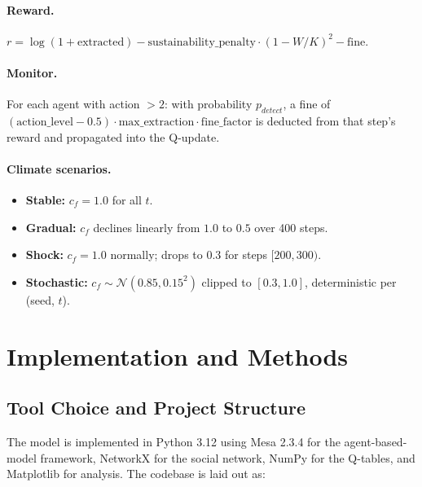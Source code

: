 \documentclass[12pt, a4paper]{article}
\begin{document}
\paragraph{Reward.}
$r = \log(1 + \text{extracted}) - \text{sustainability\_penalty} \cdot (1 - W/K)^2 - \text{fine}$.

\paragraph{Monitor.}
For each agent with action $> 2$: with probability $p_{detect}$, a fine of
$(\text{action\_level} - 0.5) \cdot \text{max\_extraction} \cdot \text{fine\_factor}$
is deducted from that step's reward and propagated into the Q-update.

\paragraph{Climate scenarios.}
\begin{itemize}[label=$\triangleright$]
    \item \textbf{Stable:} $c_f = 1.0$ for all $t$.
    \item \textbf{Gradual:} $c_f$ declines linearly from $1.0$ to $0.5$ over 400 steps.
    \item \textbf{Shock:} $c_f = 1.0$ normally; drops to $0.3$ for steps $[200, 300)$.
    \item \textbf{Stochastic:} $c_f \sim \mathcal{N}(0.85, 0.15^2)$ clipped to $[0.3, 1.0]$, deterministic per (seed, $t$).
\end{itemize}

\section{Implementation and Methods}

\subsection{Tool Choice and Project Structure}

The model is implemented in Python 3.12 using Mesa 2.3.4 for the
agent-based-model framework, NetworkX for the social network, NumPy for the
Q-tables, and Matplotlib for analysis. The codebase is laid out as:
\end{document}

